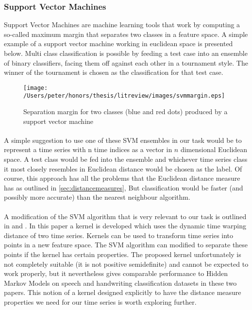 	\subsubsection{Support Vector Machines}
	\label{sec:svms}
	Support Vector Machines are machine learning tools that work by computing a so-called maximum margin that separates two classes in a feature space. A simple example of a support vector machine working in euclidean space is presented below. Multi class classification is possible by feeding a test case into an ensemble of binary classifiers, facing them off against each other in a tournament style. The winner of the tournament is chosen as the classification for that test case.
	\begin{figure}[ht!]
	\centering
	\texttt{[image: /Users/peter/honors/thesis/litreview/images/svmmargin.eps]}
	\label{svmtrain}
	\caption{Separation margin for two classes (blue and red dots) produced  by a support vector machine}
	\end{figure}
	\paragraph{}
	A simple suggestion to use one of these SVM ensembles in our task would be to represent a time series with n time indices as a vector in $n$ dimensional Euclidean space. A test class would be fed into the ensemble and whichever time series class it most closely resembles in Euclidean distance would be chosen as the label. Of course, this approach has all the problems that the Euclidean distance measure has as outlined in \ref{sec:distancemeasures}, But classification would be faster (and possibly more accurate) than the nearest neighbour algorithm.
	\paragraph{}
	A modification of the SVM algorithm that is very relevant to our task is outlined in \citep{shimodaira2002dynamic} and \citep{bahlmann2002online}. In this paper a kernel is developed which uses the dynamic time warping distance of two time series. Kernels can be used to transform time series into points in a new feature space. The SVM algorithm can modified to separate these points if the kernel has certain properties. The proposed kernel unfortunately is not completely suitable (it is not positive semidefinite) and cannot be expected to work properly, but it nevertheless gives comparable performance to Hidden Markov Models on speech and handwriting classification datasets in these two papers. This notion of a kernel designed explicitly to have the distance measure properties we need for our time series is worth exploring further.
	
